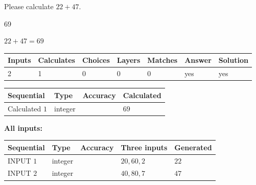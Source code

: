 \documentclass[12pt]{article}
\begin{document}
  
 
Please calculate $ %
22 +  %
47 $.
 
 
 
\noindent{}
 
 

69
 
 
\noindent{}
 
 

 
 
 
\noindent{}
 
 

$ %
22 +  %
47=   %
69$
 
 
\noindent{}
 
 

 
   
   
   
   
\noindent\begin{tabular}{|l|l|l|l|l|l|l|}
 \hline
Inputs & Calculates & Choices & Layers & Matches & Answer & Solution \\ \hline
 2  & 
 1  & 
 0
  & 
 0  & 
 0  & 
  yes & 
  yes 
  \\ \hline
 \end{tabular}
   
   
   
   
\noindent{}
   
   
  
  
\noindent\begin{tabular}{|l|l|l|l|}
\hline
 Sequential & Type & Accuracy & Calculated \\ 
\hline
 
 
  Calculated $  1 $ & integer &  & 
  $ 69 $ 
 \\  \hline  
 \end{tabular}
   
   
   
   
\noindent\vspace{0.1in}\hspace{-0.08in} {\textbf{\Large{All inputs: }}}
   
   
  
  
\noindent\begin{tabular}{|l|l|l|l|l|}
\hline
 Sequential & Type & Accuracy & Three inputs & Generated \\ 
\hline
 
 
  INPUT $  1 $ & integer &  & $
 20
 , 
 60
 , 
 2
 $ & $ 22 $ 
 \\  \hline  
 
 
  INPUT $  2 $ & integer &  & $
 40
 , 
 80
 , 
 7
 $ & $ 47 $ 
 \\  \hline  
 \end{tabular}
   
\end{document}
